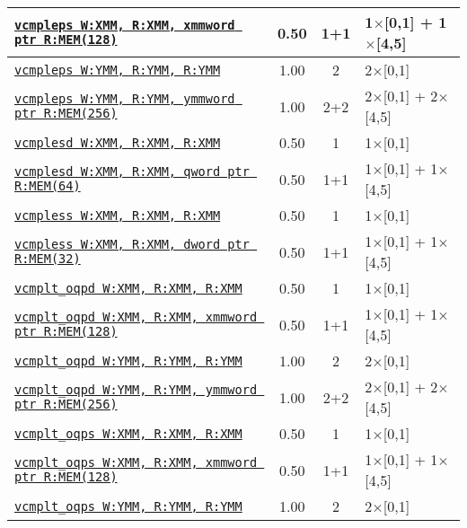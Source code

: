 \documentclass[a4paper,english,fontsize=9]{scrartcl}
\begin{document}
\begin{longtable}{p{}ccL{.25\textwidth}}
  \midrule
  \texttt{\href{https://felixcloutier.com/x86/CMPPS.html}{vcmpleps W:XMM, R:XMM, xmmword ptr R:MEM(128)}} & 0.50 & 1+1 & 1\(\times\)[0,1] + 1\(\times\)[4,5] \\
  \midrule
  \texttt{\href{https://felixcloutier.com/x86/CMPPS.html}{vcmpleps W:YMM, R:YMM, R:YMM}} & 1.00 & 2 & 2\(\times\)[0,1] \\
  \midrule
  \texttt{\href{https://felixcloutier.com/x86/CMPPS.html}{vcmpleps W:YMM, R:YMM, ymmword ptr R:MEM(256)}} & 1.00 & 2+2 & 2\(\times\)[0,1] + 2\(\times\)[4,5] \\
  \midrule
  \texttt{\href{https://felixcloutier.com/x86/CMPSD.html}{vcmplesd W:XMM, R:XMM, R:XMM}} & 0.50 & 1 & 1\(\times\)[0,1] \\
  \midrule
  \texttt{\href{https://felixcloutier.com/x86/CMPSD.html}{vcmplesd W:XMM, R:XMM, qword ptr R:MEM(64)}} & 0.50 & 1+1 & 1\(\times\)[0,1] + 1\(\times\)[4,5] \\
  \midrule
  \texttt{\href{https://felixcloutier.com/x86/CMPSS.html}{vcmpless W:XMM, R:XMM, R:XMM}} & 0.50 & 1 & 1\(\times\)[0,1] \\
  \midrule
  \texttt{\href{https://felixcloutier.com/x86/CMPSS.html}{vcmpless W:XMM, R:XMM, dword ptr R:MEM(32)}} & 0.50 & 1+1 & 1\(\times\)[0,1] + 1\(\times\)[4,5] \\
  \midrule
  \texttt{\href{https://felixcloutier.com/x86/CMPPD.html}{vcmplt\_oqpd W:XMM, R:XMM, R:XMM}} & 0.50 & 1 & 1\(\times\)[0,1] \\
  \midrule
  \texttt{\href{https://felixcloutier.com/x86/CMPPD.html}{vcmplt\_oqpd W:XMM, R:XMM, xmmword ptr R:MEM(128)}} & 0.50 & 1+1 & 1\(\times\)[0,1] + 1\(\times\)[4,5] \\
  \midrule
  \texttt{\href{https://felixcloutier.com/x86/CMPPD.html}{vcmplt\_oqpd W:YMM, R:YMM, R:YMM}} & 1.00 & 2 & 2\(\times\)[0,1] \\
  \midrule
  \texttt{\href{https://felixcloutier.com/x86/CMPPD.html}{vcmplt\_oqpd W:YMM, R:YMM, ymmword ptr R:MEM(256)}} & 1.00 & 2+2 & 2\(\times\)[0,1] + 2\(\times\)[4,5] \\
  \midrule
  \texttt{\href{https://felixcloutier.com/x86/CMPPS.html}{vcmplt\_oqps W:XMM, R:XMM, R:XMM}} & 0.50 & 1 & 1\(\times\)[0,1] \\
  \midrule
  \texttt{\href{https://felixcloutier.com/x86/CMPPS.html}{vcmplt\_oqps W:XMM, R:XMM, xmmword ptr R:MEM(128)}} & 0.50 & 1+1 & 1\(\times\)[0,1] + 1\(\times\)[4,5] \\
  \midrule
  \texttt{\href{https://felixcloutier.com/x86/CMPPS.html}{vcmplt\_oqps W:YMM, R:YMM, R:YMM}} & 1.00 & 2 & 2\(\times\)[0,1] \\

\end{longtable}
\end{document}
